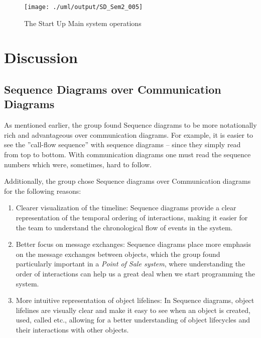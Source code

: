 \documentclass[a4paper]{scrreprt}
\begin{document}
\begin{figure}[h]
    \begin{center}
        \texttt{[image: ./uml/output/SD\_Sem2\_005]}
        \caption{The Start Up Main system operations}
        \label{fig:SD5}
    \end{center}
\end{figure}

\chapter{Discussion}
\label{sec:discussion}
\section{Sequence Diagrams over Communication Diagrams}
\label{sec:sequence-diagrams-over-communication-diagrams}
As mentioned earlier, the group found Sequence diagrams to be more notationally rich and advantageous
over communication diagrams.
For example, it is easier to see the ''call-flow sequence'' with sequence
diagrams -- since they simply read from top
to bottom.
With communication diagrams one must read the sequence numbers which were,
sometimes, hard to follow.

Additionally, the group chose Sequence diagrams over
Communication diagrams for the following reasons:
\begin{enumerate}
    \item Clearer visualization of the timeline: Sequence diagrams provide a clear
    representation of the temporal ordering of interactions, making it easier for
    the team to understand the chronological flow of events in the system.
    \item Better focus on message exchanges: Sequence diagrams place more emphasis on the
    message exchanges between objects, which the group found particularly
    important in a \emph{Point of Sale system}, where understanding the order of interactions can
    help us a great deal when we start programming the system.
    \item More intuitive representation of object lifelines:
    In Sequence diagrams, object
    lifelines are visually clear and make it easy to see when an object is created,
    used, called etc., allowing for a better understanding of object lifecycles
    and their interactions with other objects.
\end{enumerate}
\end{document}
